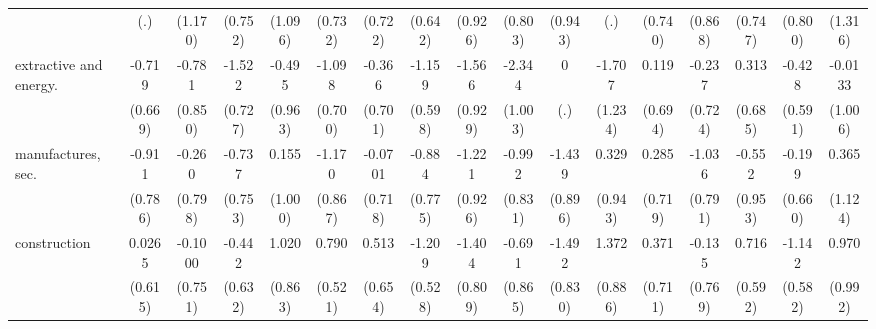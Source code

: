 {\begin{tabular}{l*{16}{c}}
                    &         (.)         &     (1.170)         &     (0.752)         &     (1.096)         &     (0.732)         &     (0.722)         &     (0.642)         &     (0.926)         &     (0.803)         &     (0.943)         &         (.)         &     (0.740)         &     (0.868)         &     (0.747)         &     (0.800)         &     (1.316)         \\
[1em]
extractive and energy.&      -0.719         &      -0.781         &      -1.522\sym{*}  &      -0.495         &      -1.098         &      -0.366         &      -1.159         &      -1.566         &      -2.344\sym{*}  &           0         &      -1.707         &       0.119         &      -0.237         &       0.313         &      -0.428         &     -0.0133         \\
                    &     (0.669)         &     (0.850)         &     (0.727)         &     (0.963)         &     (0.700)         &     (0.701)         &     (0.598)         &     (0.929)         &     (1.003)         &         (.)         &     (1.234)         &     (0.694)         &     (0.724)         &     (0.685)         &     (0.591)         &     (1.006)         \\
[1em]
manufactures, sec.  &      -0.911         &      -0.260         &      -0.737         &       0.155         &      -1.170         &     -0.0701         &      -0.884         &      -1.221         &      -0.992         &      -1.439         &       0.329         &       0.285         &      -1.036         &      -0.552         &      -0.199         &       0.365         \\
                    &     (0.786)         &     (0.798)         &     (0.753)         &     (1.000)         &     (0.867)         &     (0.718)         &     (0.775)         &     (0.926)         &     (0.831)         &     (0.896)         &     (0.943)         &     (0.719)         &     (0.791)         &     (0.953)         &     (0.660)         &     (1.124)         \\
[1em]
construction        &      0.0265         &     -0.1000         &      -0.442         &       1.020         &       0.790         &       0.513         &      -1.209\sym{*}  &      -1.404         &      -0.691         &      -1.492         &       1.372         &       0.371         &      -0.135         &       0.716         &      -1.142\sym{*}  &       0.970         \\
                    &     (0.615)         &     (0.751)         &     (0.632)         &     (0.863)         &     (0.521)         &     (0.654)         &     (0.528)         &     (0.809)         &     (0.865)         &     (0.830)         &     (0.886)         &     (0.711)         &     (0.769)         &     (0.592)         &     (0.582)         &     (0.992)         \\

\end{tabular}}
